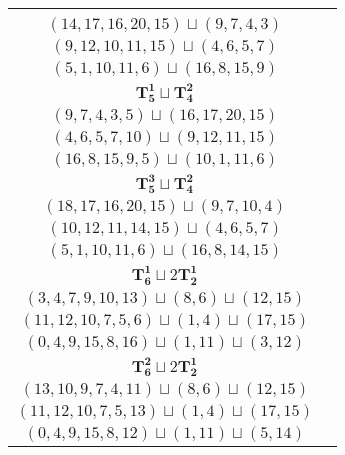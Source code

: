 \documentclass{article}
\begin{document}
\begin{longtable}{|c|c|}
\begin{tabular}{c}
        $(13,15,16,18,14)\sqcup(11,9,6,7)$ \\ 
        $(14,17,16,20,15)\sqcup(9,7,4,3)$ \\ 
        $(9,12,10,11,15)\sqcup(4,6,5,7)$ \\ 
        $(5,1,10,11,6)\sqcup(16,8,15,9)$
        \end{tabular} \\ 
        \hline
        $\mathbf{T_{5}^{1}} \sqcup \mathbf{T_{4}^{2}}$ & \begin{tabular}{c}
        $(7,6,9,11,8)\sqcup(16,15,13,14)$ \\ 
        $(9,7,4,3,5)\sqcup(16,17,20,15)$ \\ 
        $(4,6,5,7,10)\sqcup(9,12,11,15)$ \\ 
        $(16,8,15,9,5)\sqcup(10,1,11,6)$
        \end{tabular} \\ 
        \hline
        $\mathbf{T_{5}^{3}} \sqcup \mathbf{T_{4}^{2}}$ & \begin{tabular}{c}
        $(13,15,16,18,14)\sqcup(11,9,12,6)$ \\ 
        $(18,17,16,20,15)\sqcup(9,7,10,4)$ \\ 
        $(10,12,11,14,15)\sqcup(4,6,5,7)$ \\ 
        $(5,1,10,11,6)\sqcup(16,8,14,15)$
        \end{tabular} \\ 
        \hline
        $\mathbf{T_{6}^{1}} \sqcup 2\mathbf{T_{2}^{1}}$ & \begin{tabular}{c}
        $(1,2,4,6,9,12)\sqcup(13,14)\sqcup(8,7)$ \\ 
        $(3,4,7,9,10,13)\sqcup(8,6)\sqcup(12,15)$ \\ 
        $(11,12,10,7,5,6)\sqcup(1,4)\sqcup(17,15)$ \\ 
        $(0,4,9,15,8,16)\sqcup(1,11)\sqcup(3,12)$
        \end{tabular} \\ 
        \hline
        $\mathbf{T_{6}^{2}} \sqcup 2\mathbf{T_{2}^{1}}$ & \begin{tabular}{c}
        $(1,2,4,6,9,5)\sqcup(13,14)\sqcup(8,7)$ \\ 
        $(13,10,9,7,4,11)\sqcup(8,6)\sqcup(12,15)$ \\ 
        $(11,12,10,7,5,13)\sqcup(1,4)\sqcup(17,15)$ \\ 
        $(0,4,9,15,8,12)\sqcup(1,11)\sqcup(5,14)$
        \end{tabular} \\ 

\end{longtable}
\end{document}
